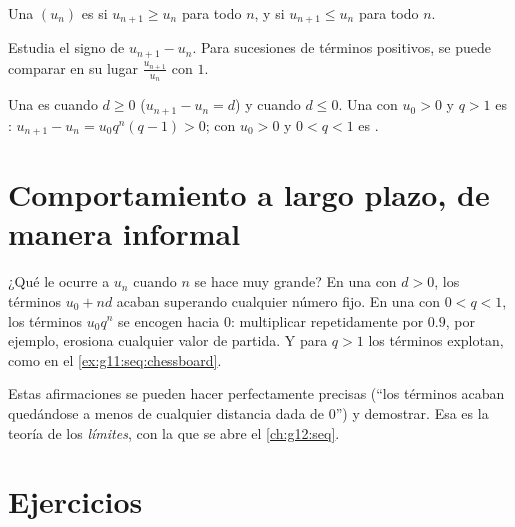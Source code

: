 \begin{definition}\label{def:g11:seq:monotone}
Una  $(u_n)$ es \emph{} si $u_{n+1} \geq u_n$ para todo
$n$, y \emph{} si $u_{n+1} \leq u_n$ para todo $n$.
\end{definition}

\begin{method}\label{met:g11:seq:monotonicity}
Estudia el signo de $u_{n+1} - u_n$. Para sucesiones de términos
positivos, se puede comparar en su lugar $\frac{u_{n+1}}{u_n}$ con $1$.
\end{method}

\begin{example}
Una  es  cuando $d \geq 0$
($u_{n+1} - u_n = d$) y  cuando $d \leq 0$. Una  con $u_0 > 0$ y $q > 1$ es :
$u_{n+1} - u_n = u_0 q^n (q - 1) > 0$; con $u_0 > 0$ y $0 < q < 1$ es
.
\end{example}

\section{Comportamiento a largo plazo, de manera informal}

¿Qué le ocurre a $u_n$ cuando $n$ se hace muy grande? En una  con $d > 0$, los términos $u_0 + nd$ acaban superando cualquier
número fijo. En una  con $0 < q < 1$, los términos
$u_0 q^n$ se encogen hacia $0$: multiplicar repetidamente por $0.9$, por
ejemplo, erosiona cualquier valor de partida. Y para $q > 1$ los términos
explotan, como en el \cref{ex:g11:seq:chessboard}.

\begin{remark}
Estas afirmaciones se pueden hacer perfectamente precisas (``los términos
acaban quedándose a menos de cualquier distancia dada de $0$'') y
demostrar. Esa es la teoría de los \emph{límites}, con la que se abre el
\cref{ch:g12:seq}.
\end{remark}

\section{Ejercicios}

